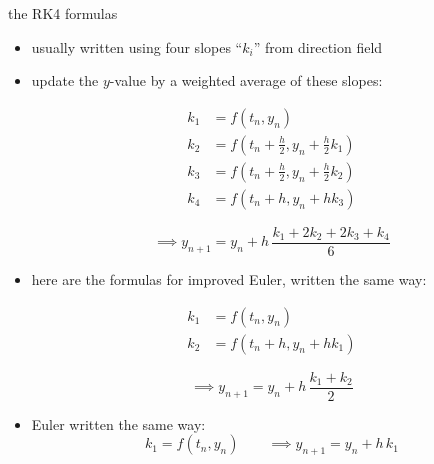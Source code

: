 \documentclass[urlcolor=blue,dvipsnames]{beamer}
\begin{document}
\begin{frame}{the RK4 formulas}

\small
\begin{itemize}
\item usually written using four slopes ``$k_i$'' from direction field
\item update the $y$-value by a weighted average of these slopes:

\vspace{-6mm}
\begin{minipage}[t]{0.4\textwidth}
\begin{align*}
k_1 &= f(t_n,y_n) \\
k_2 &= f(t_n+\frac{h}{2},y_n+\frac{h}{2} k_1) \\
k_3 &= f(t_n+\frac{h}{2},y_n+\frac{h}{2} k_2) \\
k_4 &= f(t_n+h,y_n+h k_3)
\end{align*}
\end{minipage}\begin{minipage}[t]{0.45\textwidth}
\vspace{10mm}

$$\implies y_{n+1} = y_n + h\, \frac{k_1 + 2 k_2 + 2 k_3 + k_4}{6}$$
\end{minipage}
\item here are the formulas for improved Euler, written the same way:

\vspace{-6mm}
\begin{minipage}[t]{0.4\textwidth}
\begin{align*}
k_1 &= f(t_n,y_n) \\
k_2 &= f(t_n+h,y_n+h k_1)
\end{align*}
\end{minipage}
\begin{minipage}[t]{0.4\textwidth}
\vspace{2mm}

$$\implies y_{n+1} = y_n + h\, \frac{k_1 + k_2}{2}$$
\end{minipage}
\item Euler written the same way:
$$k_1 = f(t_n,y_n) \qquad \implies y_{n+1} = y_n + h\, k_1$$
\end{itemize}
\end{frame}
\end{document}
